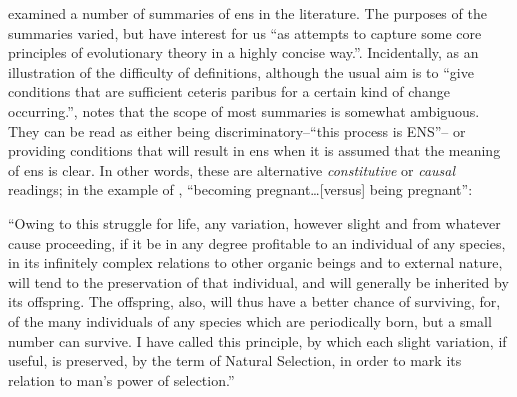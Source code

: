 \begin{NOTES}


\cite{Godfrey-Smith2007} examined a number of summaries of \gls{ens} in the literature. The purposes of the summaries varied, but have interest for us ``as attempts to capture some core principles of evolutionary theory in a highly concise way.''. Incidentally, as an illustration of the difficulty of definitions, although the usual aim is to ``give conditions that are sufficient ceteris paribus for a certain kind of change occurring.'', \cite{Godfrey-Smith2007} notes that the scope of most summaries is somewhat ambiguous. They can be read as either being discriminatory--``this process is ENS''-- or providing conditions that will result in \gls{ens} when it is assumed that the meaning of \gls{ens} is clear. In other words, these are alternative \emph{constitutive} or \emph{causal} readings; in the example of \cite{Godfrey-Smith2007}, ``becoming pregnant\ldots{}{[}versus{]} being pregnant'':

\begin{compactenum}
\item ``Owing to this struggle for life, any variation, however slight and from whatever cause proceeding, if it be in any degree profitable to an individual of any species, in its infinitely complex relations to other organic beings and to external nature, will tend to the preservation of that individual, and will generally be inherited by its offspring. The offspring, also, will thus have a better chance of surviving, for, of the many individuals of any species which are periodically born, but a small number can survive. I have called this principle, by which each slight variation, if useful, is preserved, by the term of Natural Selection, in order to mark its relation to man's power of selection.'' \cite{Darwin1859}


\end{compactenum}
\end{NOTES}
